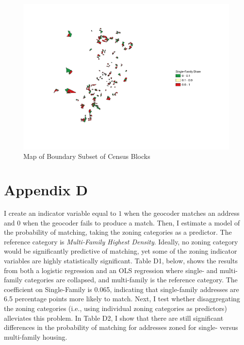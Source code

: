 \documentclass[11pt]{article}
\begin{document}
\begin{figure}[h]
    \centering
    \includegraphics[width=\textwidth]{fig_2_causal_redone.pdf}
    \caption{Map of Boundary Subset of Census Blocks}
    \label{fig:Causal_Map}
\end{figure}

\clearpage
\section*{Appendix D} 
\setcounter{table}{0}
\renewcommand{\thetable}{D\arabic{table}}

\setcounter{figure}{0}
\renewcommand{\thefigure}{D\arabic{figure}}

I create an indicator variable equal to $1$ when the geocoder matches an address and $0$ when the geocoder fails to produce a match. Then, I estimate a model of the probability of matching, taking the zoning categories as a predictor. The reference category is \textit{Multi-Family Highest Density}. Ideally, no zoning category would be significantly predictive of matching, yet some of the zoning indicator variables are highly statistically significant. Table D1, below, shows the results from both a logistic regression and an OLS regression where single- and multi-family categories are collapsed, and multi-family is the reference category. The coefficient on Single-Family is 0.065, indicating that single-family addresses are 6.5 percentage points more likely to match. Next, I test whether disaggregating the zoning categories (i.e., using individual zoning categories as predictors) alleviates this problem. In Table D2, I show that there are still significant differences in the probability of matching for addresses zoned for single- versus multi-family housing.
\end{document}
